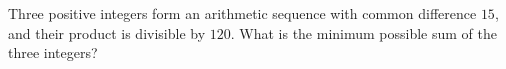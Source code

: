 Three positive integers form an arithmetic sequence with common difference $15$, and their product is divisible by $120$. What is the minimum possible sum of the three integers?
